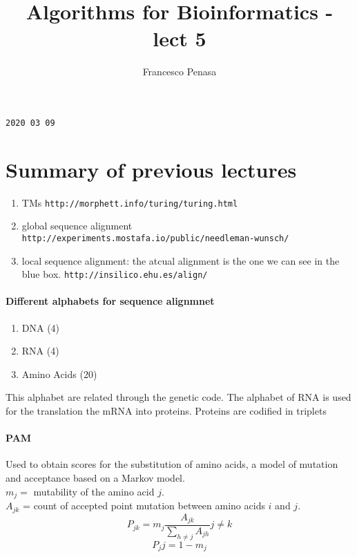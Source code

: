 \documentclass[11pt]{article}
\begin{document}
\author{Francesco Penasa}
\title{Algorithms for Bioinformatics - lect 5}
\maketitle

\medskip

\texttt{2020 03 09}
\section{Summary of previous lectures} %
\label{sec:summary_of_previous_lectures}
\begin{enumerate}
	\item TMs \texttt{http://morphett.info/turing/turing.html}
	\item global sequence alignment \texttt{http://experiments.mostafa.io/public/needleman-wunsch/}
	\item local sequence alignment: the atcual alignment is the one we can see in the blue box. \texttt{http://insilico.ehu.es/align/}
\end{enumerate}

\paragraph{Different alphabets for sequence alignmnet} %
\label{par:different_alphabets_for_sequence_alignmnet}
\begin{enumerate}
	\item DNA (4)
	\item RNA (4)
	\item Amino Acids (20)
\end{enumerate}
This alphabet are related through the genetic code. The alphabet of RNA is used for the translation the mRNA into proteins. Proteins are codified in triplets

\paragraph{PAM} %
\label{par:pam}
Used to obtain scores for the substitution of amino acids, a model of mutation and acceptance based on a Markov model.\\ $m_j = $ mutability of the amino acid $j$.\\ 
$A_{jk}$ = count of accepted point mutation between amino acids $i$ and $j$.
\[
	P_{jk} = m_j \frac{A_{jk}}{\sum_{h \neq j} A_{jh}} j \neq k
\]\[
	P_jj = 1 - m_j
\]
\end{document}
